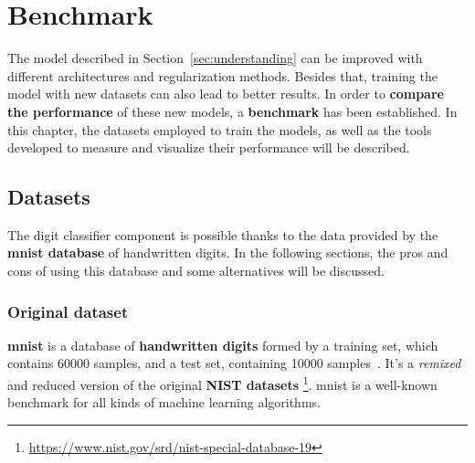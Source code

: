 \chapter{Benchmark}\label{ch:benchmark}
The model described in Section~\ref{sec:understanding} can be improved with different architectures and regularization methods. Besides that, training the model with new datasets can also lead to better results. In order to \textbf{compare the performance} of these new models, a \textbf{benchmark} has been established. In this chapter, the datasets employed to train the models, as well as the tools developed to measure and visualize their performance will be described.

\section{Datasets}\label{sec:datasets}
The digit classifier component is possible thanks to the data provided by the \textbf{\gls{mnist} database} of handwritten digits. In the following sections, the pros and cons of using this database and some alternatives will be discussed.

\subsection{Original dataset}\label{subsec:MNIST}
\textbf{\gls{mnist}} is a database of \textbf{handwritten digits} formed by a training set, which contains 60000 samples, and a test set, containing 10000 samples~\cite{lecun-mnisthandwrittendigit-2010}. It's a \textit{remixed} and reduced version of the original \textbf{NIST datasets} \footnote{\url{https://www.nist.gov/srd/nist-special-database-19}}. \gls{mnist} is a well-known benchmark for all kinds of machine learning algorithms.

